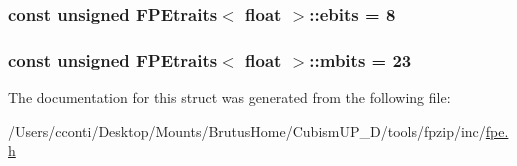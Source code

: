 \subsubsection[{ebits}]{\setlength{\rightskip}{0pt plus 5cm}const unsigned {\bf F\+P\+Etraits}$<$ float $>$\+::ebits = 8\hspace{0.3cm}{\ttfamily [static]}}\label{struct_f_p_etraits_3_01float_01_4_a33fe9667fe0d300a9a7ae9431af044ea}
\hypertarget{struct_f_p_etraits_3_01float_01_4_aabf457052178b75cbd63b00e0f9f0637}{}
\subsubsection[{mbits}]{\setlength{\rightskip}{0pt plus 5cm}const unsigned {\bf F\+P\+Etraits}$<$ float $>$\+::mbits = 23\hspace{0.3cm}{\ttfamily [static]}}\label{struct_f_p_etraits_3_01float_01_4_aabf457052178b75cbd63b00e0f9f0637}


The documentation for this struct was generated from the following file\+:\begin{DoxyCompactItemize}
\item 
/\+Users/cconti/\+Desktop/\+Mounts/\+Brutus\+Home/\+Cubism\+U\+P\+\_\+D/tools/fpzip/inc/\hyperlink{fpe_8h}{fpe.\+h}\end{DoxyCompactItemize}
